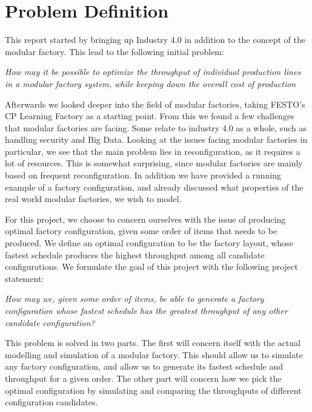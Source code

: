 \section{Problem Definition}\label{ch:problemdefinition}
This report started by bringing up Industry 4.0 in addition to the concept of the modular factory. This lead to the following initial problem:

\bigskip
\textit{How may it be possible to optimize the throughput of individual production lines in a modular factory system, while keeping down the overall cost of production}
\bigskip

Afterwards we looked deeper into the field of modular factories, taking FESTO's CP Learning Factory as a starting point. From this we found a few challenges that modular factories are facing. Some relate to industry 4.0 as a whole, such as handling security and Big Data. Looking at the issues facing modular factories in particular, we see that the main problem lies in reconfiguration, as it requires a lot of resources. This is somewhat surprising, since modular factories are mainly based on frequent reconfiguration. In addition we have provided a running example of a factory configuration, and already discussed what properties of the real world modular factories, we wish to model.

For this project, we choose to concern ourselves with the issue of producing optimal factory configuration, given some order of items that needs to be produced. We define an optimal configuration to be the factory layout, whose fastest schedule produces the highest throughput among all candidate configurations. We formulate the goal of this project with the following project statement:

\bigskip
\textit{How may we, given some order of items, be able to generate a factory configuration whose fastest schedule has the greatest throughput of any other candidate configuration?}
\bigskip

This problem is solved in two parts. The first will concern itself with the actual modelling and simulation of a modular factory. This should allow us to simulate any factory configuration, and allow us to generate its fastest schedule and throughput for a given order. The other part will concern how we pick the optimal configuration by simulating and comparing the throughputs of different configuration candidates. 

